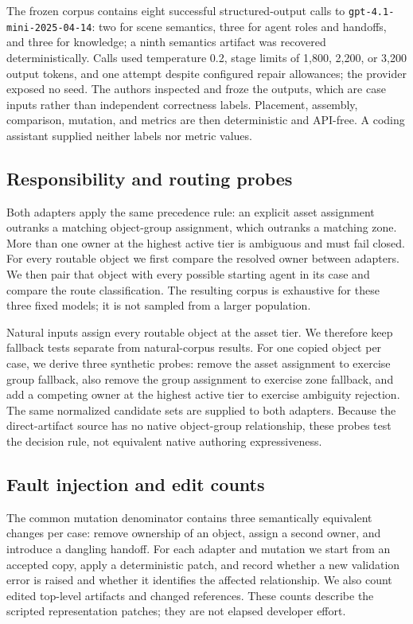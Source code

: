 The frozen corpus contains eight successful structured-output calls to
\texttt{gpt-4.1-mini-2025-04-14}: two for scene semantics, three for agent
roles and handoffs, and three for knowledge; a ninth semantics artifact was
recovered deterministically. Calls used temperature 0.2, stage limits of
1,800, 2,200, or 3,200 output tokens, and one attempt despite configured repair
allowances; the provider exposed no seed. The authors inspected and froze the
outputs, which are case inputs rather than independent correctness labels.
Placement, assembly, comparison, mutation, and metrics are then deterministic
and API-free. A coding assistant supplied neither labels nor metric values.

\subsection{Responsibility and routing probes}

Both adapters apply the same precedence rule: an explicit asset assignment
outranks a matching object-group assignment, which outranks a matching zone.
More than one owner at the highest active tier is ambiguous and must fail
closed. For every routable object we first compare the resolved owner between
adapters. We then pair that object with every possible starting agent in its
case and compare the route classification. The resulting corpus is exhaustive
for these three fixed models; it is not sampled from a larger population.

Natural inputs assign every routable object at the asset tier. We therefore
keep fallback tests separate from natural-corpus results. For one copied object
per case, we derive three synthetic probes: remove the asset assignment to
exercise group fallback, also remove the group assignment to exercise zone
fallback, and add a competing owner at the highest active tier to exercise
ambiguity rejection. The same normalized candidate sets are supplied to both
adapters. Because the direct-artifact source has no native object-group
relationship, these probes test the decision rule, not equivalent native
authoring expressiveness.

\subsection{Fault injection and edit counts}

The common mutation denominator contains three semantically equivalent changes
per case: remove ownership of an object, assign a second owner, and introduce a
dangling handoff. For each adapter and mutation we start from an accepted
copy, apply a deterministic patch, and record whether a new validation error is
raised and whether it identifies the affected relationship. We also count
edited top-level artifacts and changed references. These counts describe the
scripted representation patches; they are not elapsed developer effort.


